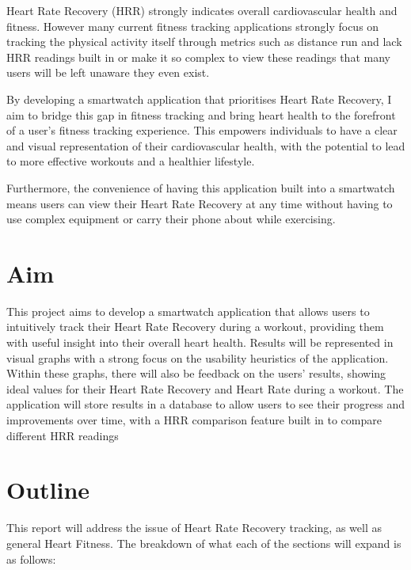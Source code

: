 \documentclass{l4proj}
\begin{document}
Heart Rate Recovery (HRR) strongly indicates overall cardiovascular health and fitness. However many current fitness tracking applications strongly focus on tracking the physical activity itself through metrics such as distance run and lack HRR readings built in or make it so complex to view these readings that many users will be left unaware they even exist. 

By developing a smartwatch application that prioritises Heart Rate Recovery, I aim to bridge this gap in fitness tracking and bring heart health to the forefront of a user’s fitness tracking experience. This empowers individuals to have a clear and visual representation of their cardiovascular health, with the potential to lead to more effective workouts and a healthier lifestyle.

Furthermore, the convenience of having this application built into a smartwatch means users can view their Heart Rate Recovery at any time without having to use complex equipment or carry their phone about while exercising.

\section{Aim}
\label{sec:aim}

This project aims to develop a smartwatch application that allows users to intuitively track their Heart Rate Recovery during a workout, providing them with useful insight into their overall heart health. Results will be represented in visual graphs with a strong focus on the usability heuristics of the application. Within these graphs, there will also be feedback on the users' results, showing ideal values for their Heart Rate Recovery and Heart Rate during a workout. The application will store results in a database to allow users to see their progress and improvements over time, with a HRR comparison feature built in to compare different HRR readings

\section{Outline}
\label{sec:outline}

This report will address the issue of Heart Rate Recovery tracking, as well as general Heart Fitness. The breakdown of what each of the sections will expand is as follows:
\end{document}

